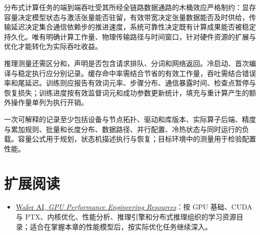 \documentclass[../textbook.tex]{subfiles}
\begin{document}
\begin{note}[算力吞吐的链路约束与瓶颈判定]
分布式计算任务的端到端吞吐受其所经全链路数据通路的木桶效应严格制约：显存容量决定模型状态与激活张量能否驻留，有效带宽决定张量数据能否及时供给，传输延迟决定集合通信依赖步的推进速度，系统可靠性决定既有计算成果能否被稳定持久化。唯有明确计算工作量、物理传输路径与时间窗口，针对硬件资源的扩展与优化才能转化为实际吞吐收益。
\end{note}

推理测量还需区分和，声明是否包含请求排队、分词和网络返回。冷启动、首次编译与稳定执行应分别记录。缓存命中率需结合节省的有效工作量，吞吐需结合错误率和尾延迟。训练则应报告有效词元率、步骤分布、通信暴露时间、检查点暂停与恢复损失；训练进度按有效监督词元和成功参数更新统计，填充与重计算产生的额外操作量单列为执行开销。

一次可解释的记录至少包括设备与节点拓扑、驱动和库版本、实际算子后端、精度与累加规则、批量和长度分布、数据路径、并行配置、冷热状态与同时运行的负载。容量公式用于规划，状态机描述执行与恢复；目标环境中的测量用于检验配置性能。

\section*{扩展阅读}
\begin{itemize}
  \item \href{https://github.com/wafer-ai/gpu-perf-engineering-resources}{Wafer AI, \emph{GPU Performance Engineering Resources}}：按 GPU 基础、CUDA 与 PTX、内核优化、性能分析、推理引擎和分布式推理组织的学习资源目录；适合在掌握本章的性能模型后，按实际优化任务继续深入。
\end{itemize}

\chapterreferences
\myendchapterdocument
\end{document}
